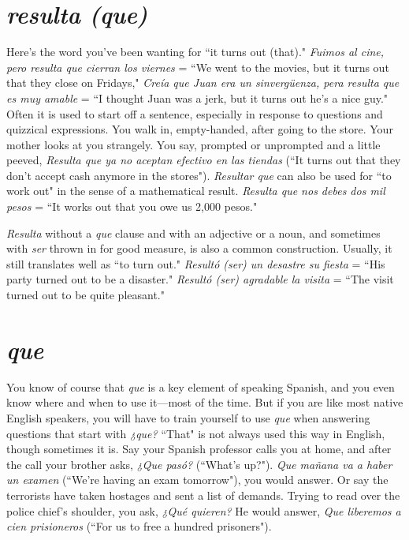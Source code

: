 \section{\emph{resulta (que)}}

Here's the word you've been wanting for ``it turns out (that)."
\emph{Fuimos al cine, pero resulta que cierran los viernes} = ``We went to
the movies, but it turns out that they close on Fridays," \emph{Creía que
Juan era un sinvergüenza, pera resulta que es muy amable} = ``I
thought Juan was a jerk, but it turns out he's a nice guy." Often it is
used to start off a sentence, especially in response to questions and
quizzical expressions. You walk in, empty-handed, after going to the
store. Your mother looks at you strangely. You say, prompted or unprompted and a little peeved, \emph{Resulta que ya no aceptan efectivo en
las tiendas} (``It turns out that they don't accept cash anymore in the
stores"). \emph{Resultar que} can also be used for ``to work out" in the sense
of a mathematical result. \emph{Resulta que nos debes dos mil pesos} = ``It
works out that you owe us 2,000 pesos."

\emph{Resulta} without a \emph{que} clause and with an adjective or a noun,
and sometimes with \emph{ser} thrown in for good measure, is also a common
construction. Usually, it still translates well as ``to turn out." \emph{Resultó
(ser) un desastre su fiesta} = ``His party turned out to be a disaster."
\emph{Resultó (ser) agradable la visita} = ``The visit turned out to be quite
pleasant."

\section{\emph{que}}

You know of course that \emph{que} is a key element of speaking
Spanish, and you even know where and when to use it---most of the
time. But if you are like most native English speakers, you will have
to train yourself to use \emph{que} when answering questions that start with
\emph{¿que?} ``That" is not always used this way in English, though sometimes it is. Say your Spanish professor calls you at home, and after the
call your brother asks, \emph{¿Que pasó?} (``What's up?"). \emph{Que mañana va a
haber un examen} (``We're having an exam tomorrow"), you would answer. Or say the terrorists have taken hostages and sent a list of demands. Trying to read over the police chief's shoulder, you ask, \emph{¿Qué
quieren?} He would answer, \emph{Que liberemos a cien prisioneros} (``For us
to free a hundred prisoners").

